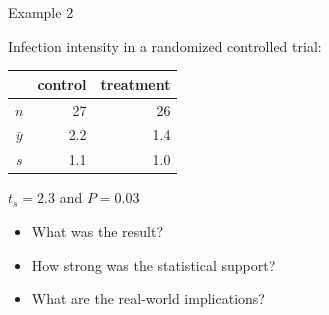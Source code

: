 \begin{frame}{Example 2}

    Infection intensity in a randomized controlled trial:
  \begin{center}
    \begin{tabular}{crr}
       & control & treatment \\
       \hline
       $n$ & 27 & 26 \\
       $\bar y$ & 2.2 & 1.4 \\
       $s$ & 1.1 & 1.0
     \end{tabular}

     \vspace{1em}

     $t_s=2.3$ and $P=0.03$
 \end{center}

     \begin{itemize}
        \item \alert{What was the result?} \\
        \item \alert{How strong was the statistical support?} \\
        \item \alert{What are the real-world implications?} \\
     \end{itemize}

\end{frame}

